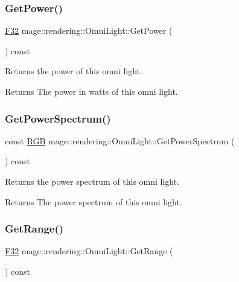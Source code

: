 \subsubsection{\texorpdfstring{Get\+Power()}{GetPower()}}
{\footnotesize\ttfamily \mbox{\hyperlink{namespacemage_aa97e833b45f06d60a0a9c4fc22ae02c0}{F32}} mage\+::rendering\+::\+Omni\+Light\+::\+Get\+Power (\begin{DoxyParamCaption}{ }\end{DoxyParamCaption}) const\hspace{0.3cm}{\ttfamily [noexcept]}}

Returns the power of this omni light.

\begin{DoxyReturn}{Returns}
The power in watts of this omni light. 
\end{DoxyReturn}
\mbox{\label{classmage_1_1rendering_1_1_omni_light_a82366151b99cc4791d8b361331f75833}} 
\subsubsection{\texorpdfstring{Get\+Power\+Spectrum()}{GetPowerSpectrum()}}
{\footnotesize\ttfamily const \mbox{\hyperlink{structmage_1_1_r_g_b}{R\+GB}} mage\+::rendering\+::\+Omni\+Light\+::\+Get\+Power\+Spectrum (\begin{DoxyParamCaption}{ }\end{DoxyParamCaption}) const\hspace{0.3cm}{\ttfamily [noexcept]}}

Returns the power spectrum of this omni light.

\begin{DoxyReturn}{Returns}
The power spectrum of this omni light. 
\end{DoxyReturn}
\mbox{\label{classmage_1_1rendering_1_1_omni_light_af9bfc4b943b156756cd7c2323d93ebdd}} 
\subsubsection{\texorpdfstring{Get\+Range()}{GetRange()}}
{\footnotesize\ttfamily \mbox{\hyperlink{namespacemage_aa97e833b45f06d60a0a9c4fc22ae02c0}{F32}} mage\+::rendering\+::\+Omni\+Light\+::\+Get\+Range (\begin{DoxyParamCaption}{ }\end{DoxyParamCaption}) const\hspace{0.3cm}{\ttfamily [noexcept]}}

